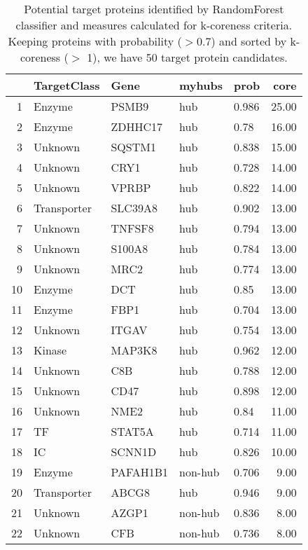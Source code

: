 \documentclass[a4paper,8pt,twocolumn,5p]{elsarticle}
\begin{document}
\begin{table*}[h]
\centering \scriptsize \caption{Potential target proteins identified by RandomForest classifier and measures calculated for k-coreness criteria. Keeping proteins with probability ($>$0.7) and sorted by k-coreness ($>$ 1), we have 50 target protein candidates.}
\label{newtargets}

\begin{tabular}{rllllr}
  \hline
 & TargetClass & Gene & myhubs & prob & core \\ 
  \hline
1 & Enzyme & PSMB9 & hub & 0.986 & 25.00 \\ 
  2 & Enzyme & ZDHHC17 & hub & 0.78 & 16.00 \\ 
  3 & Unknown & SQSTM1 & hub & 0.838 & 15.00 \\ 
  4 & Unknown & CRY1 & hub & 0.728 & 14.00 \\ 
  5 & Unknown & VPRBP & hub & 0.822 & 14.00 \\ 
  6 & Transporter & SLC39A8 & hub & 0.902 & 13.00 \\ 
  7 & Unknown & TNFSF8 & hub & 0.794 & 13.00 \\ 
  8 & Unknown & S100A8 & hub & 0.784 & 13.00 \\ 
  9 & Unknown & MRC2 & hub & 0.774 & 13.00 \\ 
  10 & Enzyme & DCT & hub & 0.85 & 13.00 \\ 
  11 & Enzyme & FBP1 & hub & 0.704 & 13.00 \\ 
  12 & Unknown & ITGAV & hub & 0.754 & 13.00 \\ 
  13 & Kinase & MAP3K8 & hub & 0.962 & 12.00 \\ 
  14 & Unknown & C8B & hub & 0.788 & 12.00 \\ 
  15 & Unknown & CD47 & hub & 0.898 & 12.00 \\ 
  16 & Unknown & NME2 & hub & 0.84 & 11.00 \\ 
  17 & TF & STAT5A & hub & 0.714 & 11.00 \\ 
  18 & IC & SCNN1D & hub & 0.826 & 10.00 \\ 
  19 & Enzyme & PAFAH1B1 & non-hub & 0.706 & 9.00 \\ 
  20 & Transporter & ABCG8 & hub & 0.946 & 9.00 \\ 
  21 & Unknown & AZGP1 & non-hub & 0.836 & 8.00 \\ 
  22 & Unknown & CFB & non-hub & 0.736 & 8.00 \\ 

\end{tabular}
\end{table*}
\end{document}
